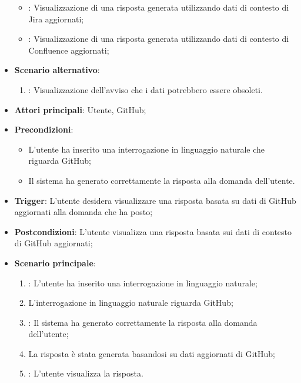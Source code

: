\begin{itemize}
\begin{itemize}
        \item {}: Visualizzazione di una risposta generata utilizzando dati di contesto di 
        Jira aggiornati;
        \item {}: Visualizzazione di una risposta generata utilizzando dati di contesto di 
        Confluence aggiornati;
    \end{itemize}
    \item \textbf{Scenario alternativo}:
    \begin{enumerate}
        \item {}: Visualizzazione dell’avviso che i dati potrebbero essere obsoleti.
    \end{enumerate}
\end{itemize}



\hypertarget{UC11.1}{}

\begin{itemize}
    \item \textbf{Attori principali}: Utente, GitHub;
    \item \textbf{Precondizioni}: 
    \begin{itemize}
        \item L'utente ha inserito una interrogazione in linguaggio naturale che riguarda GitHub;
        \item Il sistema ha generato correttamente la risposta alla domanda dell'utente.
    \end{itemize}
    \item \textbf{Trigger}: L'utente desidera visualizzare una risposta basata su dati di GitHub aggiornati alla domanda che ha posto;
    \item \textbf{Postcondizioni}: L'utente visualizza una risposta basata sui dati di contesto di GitHub aggiornati;
    \item \textbf{Scenario principale}: 
    \begin{enumerate}
        \item {}: L'utente ha inserito una interrogazione in linguaggio naturale;
        \item L'interrogazione in linguaggio naturale riguarda GitHub;
        \item {}: Il sistema ha generato correttamente la risposta alla domanda dell'utente;
        \item La risposta è stata generata basandosi su dati aggiornati di GitHub;
        \item {}: L'utente visualizza la risposta.
    \end{enumerate}
\end{itemize}



